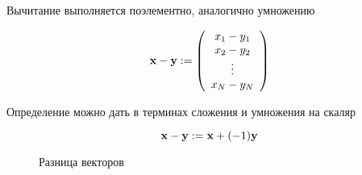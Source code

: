 \begin{frame}
    
    \vspace{2em}
    Вычитание выполняется поэлементно, аналогично умножению 

    \begin{equation*}
        {\mathbf x} - {\mathbf y} 
        :=
        \left(
        \begin{array}{c}
            x_1 - y_1 \\
            x_2 - y_2 \\
            \vdots \\
            x_N - y_N
        \end{array}
        \right)
    \end{equation*}
    
    \vspace{.7em}
    Определение можно дать в терминах сложения и умножения на скаляр

    \begin{equation*}
      {\mathbf x} - {\mathbf y} := {\mathbf x} + (-1) {\mathbf y}      
    \end{equation*}

\end{frame}



\begin{frame}

     \vspace{2em}
    \begin{figure}
       \begin{center}
       \caption{\label{f:vec_minus} Разница векторов}
       \end{center}
    \end{figure}

\end{frame}




    





